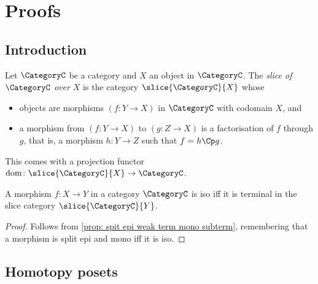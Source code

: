 \newpage
\section*{Proofs}

\subsection*{Introduction}

    \begin{definition}\label{dfn:slice_category}
        Let $\CategoryC$ be a category and $X$ an object in $\CategoryC$.
        The \emph{slice of $\CategoryC$ over $X$} is the category $\slice{\CategoryC}{X}$ whose
        \begin{itemize}
            \item objects are morphisms $(f\colon Y \to X)$ in $\CategoryC$ with codomain $X$, and
            \item a morphism from $(f\colon Y \to X)$ to $(g\colon Z \to X)$ is a factorisation of $f$ through $g$, that is, a morphism $h\colon Y \to Z$ such that $f = h\Cp g$.
        \end{itemize}
        This comes with a projection functor $\mathrm{dom}\colon \slice{\CategoryC}{X} \to \CategoryC$.
    \end{definition}

    \begingroup
    \def\theproposition{\ref{prop: iso if terminal in slice}}
    \begin{proposition}
        A morphism $f:X \to Y$ in a category $\CategoryC$ is iso iff it is terminal in the slice category $\slice{\CategoryC}{Y}$.
    \end{proposition}
    \addtocounter{proposition}{-1}
    \endgroup
    \begin{proof}
    Follows from \autoref{prop: spit epi weak term mono subterm}, remembering that a morphism is split epi and mono iff it is iso.
    \end{proof}


\subsection*{Homotopy posets}

